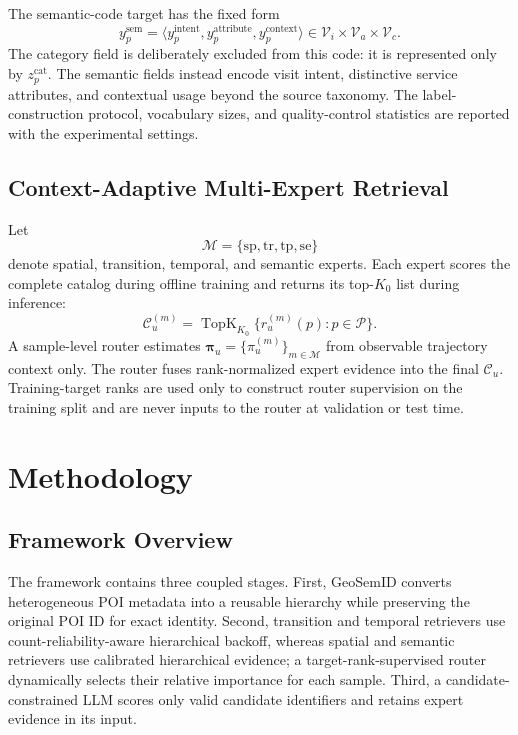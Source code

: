 \documentclass[journal]{IEEEtran}
\newcommand{\Experts}{\mathcal{M}}
\newcommand{\POIs}{\mathcal{P}}
\begin{document}
The semantic-code target has the fixed form
\begin{equation}
y_p^{\mathrm{sem}}
=
\langle
y_p^{\mathrm{intent}},
y_p^{\mathrm{attribute}},
y_p^{\mathrm{context}}
\rangle
\in
\mathcal{V}_{i}\times\mathcal{V}_{a}\times\mathcal{V}_{c}.
\label{eq:semantic_schema}
\end{equation}
The category field is deliberately excluded from this code: it is represented
only by $z_p^{\mathrm{cat}}$. The semantic fields instead encode visit intent,
distinctive service attributes, and contextual usage beyond the source
taxonomy. The label-construction protocol, vocabulary sizes, and quality-control
statistics are reported with the experimental settings.

\subsection{Context-Adaptive Multi-Expert Retrieval}

Let
\begin{equation}
\Experts=\{\mathrm{sp},\mathrm{tr},\mathrm{tp},\mathrm{se}\}
\label{eq:expert_set}
\end{equation}
denote spatial, transition, temporal, and semantic experts.
Each expert scores the complete catalog during offline training and returns
its top-$K_0$ list during inference:
\begin{equation}
\mathcal{C}_{u}^{(m)}
=
\operatorname{TopK}_{K_0}
\{r_{u}^{(m)}(p):p\in\POIs\}.
\label{eq:expert_candidate}
\end{equation}
A sample-level router estimates $\bm{\pi}_u=\{\pi_u^{(m)}\}_{m\in\Experts}$
from observable trajectory context only.
The router fuses rank-normalized expert evidence into the final
$\mathcal{C}_u$.
Training-target ranks are used only to construct router supervision on the
training split and are never inputs to the router at validation or test time.

\section{Methodology}
\label{sec:method}

\subsection{Framework Overview}

The framework contains three coupled stages.
First, GeoSemID converts heterogeneous POI metadata into a reusable hierarchy
while preserving the original POI ID for exact identity.
Second, transition and temporal retrievers use count-reliability-aware
hierarchical backoff, whereas spatial and semantic retrievers use calibrated
hierarchical evidence; a target-rank-supervised router dynamically selects
their relative importance for each sample.
Third, a candidate-constrained LLM scores only valid candidate identifiers and
retains expert evidence in its input.
\end{document}
